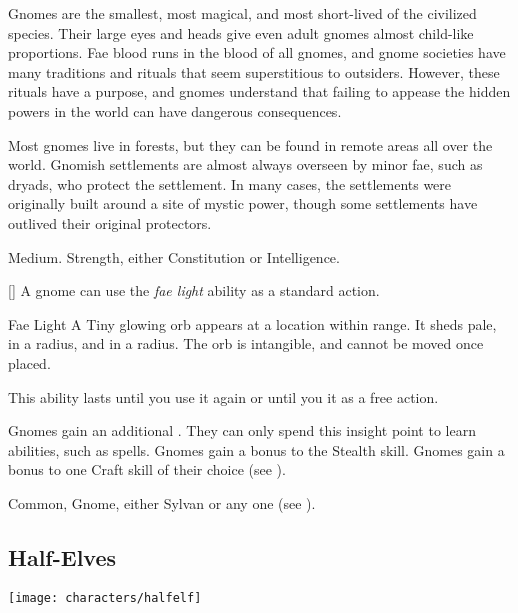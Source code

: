         Gnomes are the smallest, most magical, and most short-lived of the civilized species.
        Their large eyes and heads give even adult gnomes almost child-like proportions.
        Fae blood runs in the blood of all gnomes, and gnome societies have many traditions and rituals that seem superstitious to outsiders.
        However, these rituals have a purpose, and gnomes understand that failing to appease the hidden powers in the world can have dangerous consequences.

        Most gnomes live in forests, but they can be found in remote areas all over the world.
        Gnomish settlements are almost always overseen by minor fae, such as dryads, who protect the settlement.
        In many cases, the settlements were originally built around a site of mystic power, though some settlements have outlived their original protectors.

         Medium.
          Strength, either  Constitution or  Intelligence.
        \begin{raggeditemize}
            [\sparkle] A gnome can use the \textit{fae light} ability as a standard action.
                \begin{activeability}{Fae Light}
                    \rankline
                    A Tiny glowing orb appears at a location within \rngmed range.
                    It sheds pale,  in a \areasmall radius, and  in a \areamed radius.
                    The orb is intangible, and cannot be moved once placed.

                    This ability lasts until you use it again or until you  it as a free action.
                \end{activeability}
             Gnomes gain an additional .
                They can only spend this insight point to learn \magical abilities, such as spells.
             Gnomes gain a  bonus to the Stealth skill.
             Gnomes gain a  bonus to one Craft skill of their choice (see ).
        \end{raggeditemize}
         Common, Gnome, either Sylvan or any one  (see ).

    \subsection{Half-Elves}\label{Half-Elves}
        \texttt{[image: characters/halfelf]}

